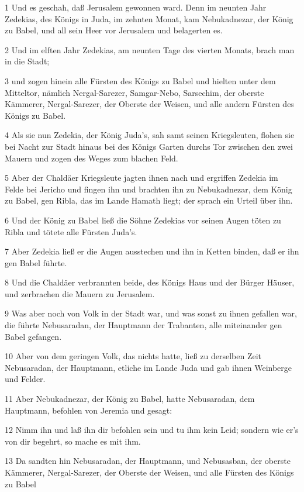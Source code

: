 \par 1 Und es geschah, daß Jerusalem gewonnen ward. Denn im neunten Jahr Zedekias, des Königs in Juda, im zehnten Monat, kam Nebukadnezar, der König zu Babel, und all sein Heer vor Jerusalem und belagerten es.
\par 2 Und im elften Jahr Zedekias, am neunten Tage des vierten Monats, brach man in die Stadt;
\par 3 und zogen hinein alle Fürsten des Königs zu Babel und hielten unter dem Mitteltor, nämlich Nergal-Sarezer, Samgar-Nebo, Sarsechim, der oberste Kämmerer, Nergal-Sarezer, der Oberste der Weisen, und alle andern Fürsten des Königs zu Babel.
\par 4 Als sie nun Zedekia, der König Juda's, sah samt seinen Kriegsleuten, flohen sie bei Nacht zur Stadt hinaus bei des Königs Garten durchs Tor zwischen den zwei Mauern und zogen des Weges zum blachen Feld.
\par 5 Aber der Chaldäer Kriegsleute jagten ihnen nach und ergriffen Zedekia im Felde bei Jericho und fingen ihn und brachten ihn zu Nebukadnezar, dem König zu Babel, gen Ribla, das im Lande Hamath liegt; der sprach ein Urteil über ihn.
\par 6 Und der König zu Babel ließ die Söhne Zedekias vor seinen Augen töten zu Ribla und tötete alle Fürsten Juda's.
\par 7 Aber Zedekia ließ er die Augen ausstechen und ihn in Ketten binden, daß er ihn gen Babel führte.
\par 8 Und die Chaldäer verbrannten beide, des Königs Haus und der Bürger Häuser, und zerbrachen die Mauern zu Jerusalem.
\par 9 Was aber noch von Volk in der Stadt war, und was sonst zu ihnen gefallen war, die führte Nebusaradan, der Hauptmann der Trabanten, alle miteinander gen Babel gefangen.
\par 10 Aber von dem geringen Volk, das nichts hatte, ließ zu derselben Zeit Nebusaradan, der Hauptmann, etliche im Lande Juda und gab ihnen Weinberge und Felder.
\par 11 Aber Nebukadnezar, der König zu Babel, hatte Nebusaradan, dem Hauptmann, befohlen von Jeremia und gesagt:
\par 12 Nimm ihn und laß ihn dir befohlen sein und tu ihm kein Leid; sondern wie er's von dir begehrt, so mache es mit ihm.
\par 13 Da sandten hin Nebusaradan, der Hauptmann, und Nebusasban, der oberste Kämmerer, Nergal-Sarezer, der Oberste der Weisen, und alle Fürsten des Königs zu Babel
